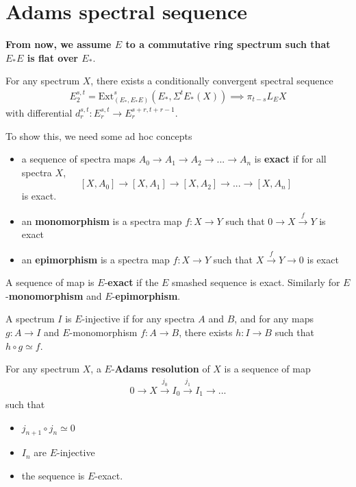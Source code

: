 \section{Adams spectral sequence}\label{sec:preliminary-adamsnovikov}
\textbf{From now, we assume $E$ to a commutative ring spectrum such that $E_*E$ is flat over $E_*$}.

\begin{theorem}
\cite{PreAdams}\cite{PreRavenelGreen} \cite{PreLurie} \cite{ChrHopkins}
    For any spectrum $X$, there exists a conditionally convergent spectral sequence
    \begin{align*}
        E^{s,t}_2=\mathrm{Ext}^{s}_{(E_*, E_*E)}(E_*,\Sigma^tE_*(X))\implies \pi_{t-s}L_E X
    \end{align*}
    with differential $d_r^{s,t}: E_r^{s,t}\to E_r^{s+r,t+r-1}$.
\end{theorem}

To show this, we need some ad hoc concepts
\begin{definition}
    \begin{itemize}
        \item a sequence of spectra maps $A_0\to A_1\to A_2\to ...\to A_n$ is \textbf{exact} if for all spectra $X$, 
        \[
        [X,A_0]\to [X,A_1]\to [X,A_2]\to ...\to [X,A_n]
        \] is exact.
        \item an \textbf{monomorphism} is a spectra map $f: X\to Y$ such that $0\to X\xrightarrow{f} Y$ is exact
        \item an \textbf{epimorphism} is a spectra map $f: X\to Y$ such that $ X\xrightarrow{f} Y\to 0$ is exact
    \end{itemize}
        A sequence of map is $E$-\textbf{exact} if the $E$ smashed sequence is exact. Similarly for $E$-\textbf{monomorphism} and $E$-\textbf{epimorphism}.
\end{definition}

\begin{definition}
    A spectrum $I$ is $E$-injective if for any spectra $A$ and $B$, and for any maps $g: A\to I$ and $E$-monomorphism $f: A\to B$, there exists $h:I\to B$ such that $h\circ g\simeq f$.
\end{definition}

\begin{definition}
    For any spectrum $X$, a $E$-\textbf{Adams resolution} of $X$ is a sequence of map
    \begin{align*}
        0\to X\xrightarrow{j_0}I_0\xrightarrow{j_1} I_1\to...
    \end{align*}
    such that 
    \begin{itemize}
        \item $j_{n+1}\circ j_n\simeq 0$
        \item $I_n$ are $E$-injective
        \item the sequence is $E$-exact.
    \end{itemize}
\end{definition}

